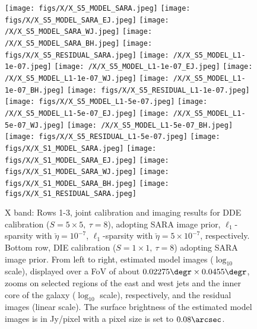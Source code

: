 \begin{landscape}
\begin{figure}
\centering
\texttt{[image: figs/X/X\_S5\_MODEL\_SARA.jpeg]}
\texttt{[image: figs/X/X\_S5\_MODEL\_SARA\_EJ.jpeg]}
\texttt{[image: /X/X\_S5\_MODEL\_SARA\_WJ.jpeg]}
\texttt{[image: /X/X\_S5\_MODEL\_SARA\_BH.jpeg]}
\texttt{[image: figs/X/X\_S5\_RESIDUAL\_SARA.jpeg]}
%
\texttt{[image: /X/X\_S5\_MODEL\_L1-1e-07.jpeg]}
\texttt{[image: /X/X\_S5\_MODEL\_L1-1e-07\_EJ.jpeg]}
\texttt{[image: /X/X\_S5\_MODEL\_L1-1e-07\_WJ.jpeg]}
\texttt{[image: /X/X\_S5\_MODEL\_L1-1e-07\_BH.jpeg]}
\texttt{[image: figs/X/X\_S5\_RESIDUAL\_L1-1e-07.jpeg]}
%
\texttt{[image: figs/X/X\_S5\_MODEL\_L1-5e-07.jpeg]}
\texttt{[image: /X/X\_S5\_MODEL\_L1-5e-07\_EJ.jpeg]}
\texttt{[image: /X/X\_S5\_MODEL\_L1-5e-07\_WJ.jpeg]}
\texttt{[image: /X/X\_S5\_MODEL\_L1-5e-07\_BH.jpeg]}
\texttt{[image: figs/X/X\_S5\_RESIDUAL\_L1-5e-07.jpeg]}
%
\texttt{[image: figs/X/X\_S1\_MODEL\_SARA.jpeg]}
\texttt{[image: figs/X/X\_S1\_MODEL\_SARA\_EJ.jpeg]}
\texttt{[image: figs/X/X\_S1\_MODEL\_SARA\_WJ.jpeg]}
\texttt{[image: figs/X/X\_S1\_MODEL\_SARA\_BH.jpeg]}
\texttt{[image: figs/X/X\_S1\_RESIDUAL\_SARA.jpeg]}

\caption{X band: Rows 1-3, joint calibration and imaging results for DDE calibration ($S=5\times 5,~\tau=8$), adopting SARA image prior,  $\ell_1$-sparsity with $\check{\eta} =10^{-7}$, $\ell_1$-sparsity with $\check{\eta} =5\times 10^{-7}$, respectively. Bottom row, DIE calibration  ($S=1\times 1,~\tau=8$) adopting SARA image prior. From left to right,  estimated model images ($\log_{10}$ scale), {{displayed over a FoV of about $0.02275\degr \times 0.0455\degr$}}, zooms on selected regions of the east and west jets and the inner core of the galaxy ($\log_{10}$ scale), respectively, and the residual images (linear scale). The surface brightness of the estimated model images is in Jy/pixel with a pixel size is set to $0.08\arcsec$.}
\label{fig:x_maps_dde}

\end{figure}
\end{landscape}
